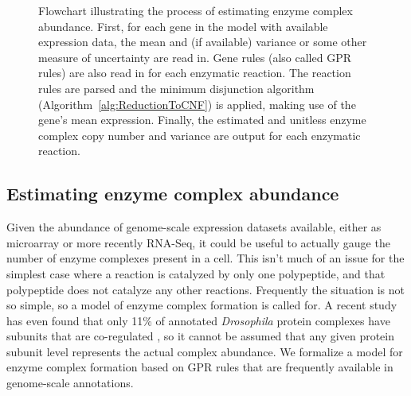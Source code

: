 \vspace{5 mm} 
\begin{figure}
\begin{center}
\end{center}
\caption{Flowchart illustrating the process of estimating enzyme
  complex abundance. First, for each gene in the model with
  available expression data, the mean and (if available) variance or
  some other measure of uncertainty are read in. Gene rules (also
  called GPR rules) are also read in for each enzymatic reaction. The
  reaction rules are parsed and the minimum disjunction algorithm
  (Algorithm~\ref{alg:ReductionToCNF}) is applied, making use of the
  gene's mean expression. Finally, the estimated and unitless enzyme
  complex copy number and variance are output for each enzymatic
  reaction.}
\label{ECCN_flowchart}
\end{figure}

\subsection{Estimating enzyme complex abundance}

Given the abundance of genome-scale expression datasets available,
either as microarray or more recently RNA-Seq, it could be useful to
actually gauge the number of enzyme complexes present in a cell. This
isn't much of an issue for the simplest case where a reaction is
catalyzed by only one polypeptide, and that polypeptide does not
catalyze any other reactions.  Frequently the situation is not so
simple, so a model of enzyme complex formation is called for. A recent
study has even found that only 11\% of annotated \textit{Drosophila}
protein complexes have subunits that are co-regulated
\citep{Juschke2013}, so it cannot be assumed that any given protein
subunit level represents the actual complex abundance. We formalize a
model for enzyme complex formation based on GPR rules that are
frequently available in genome-scale annotations.

